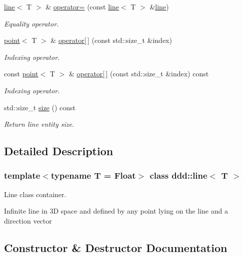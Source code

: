 \begin{DoxyCompactItemize}
\hyperlink{classddd_1_1line}{line}$<$ T $>$ \& \hyperlink{classddd_1_1line_a22cb20bea375f801ada57f910f6d66e2}{operator=} (const \hyperlink{classddd_1_1line}{line}$<$ T $>$ \&\hyperlink{classddd_1_1line}{line})
\begin{DoxyCompactList}\small\item\em Equality operator. \end{DoxyCompactList}\item 
\hyperlink{classddd_1_1point}{point}$<$ T $>$ \& \hyperlink{classddd_1_1line_a04a2abe2c302b5ca97074116b2c39499}{operator\mbox{[}$\,$\mbox{]}} (const std\+::size\+\_\+t \&index)
\begin{DoxyCompactList}\small\item\em Indexing operator. \end{DoxyCompactList}\item 
const \hyperlink{classddd_1_1point}{point}$<$ T $>$ \& \hyperlink{classddd_1_1line_af12bf431234fac2996ca667ee4f70f3a}{operator\mbox{[}$\,$\mbox{]}} (const std\+::size\+\_\+t \&index) const
\begin{DoxyCompactList}\small\item\em Indexing operator. \end{DoxyCompactList}\item 
\mbox{\label{classddd_1_1line_a0ea347ed20be8fdfe15f960008e3e475}} 
std\+::size\+\_\+t \hyperlink{classddd_1_1line_a0ea347ed20be8fdfe15f960008e3e475}{size} () const
\begin{DoxyCompactList}\small\item\em Return line entity size. \end{DoxyCompactList}\end{DoxyCompactItemize}


\subsection{Detailed Description}
\subsubsection*{template$<$typename T = Float$>$\newline
class ddd\+::line$<$ T $>$}

Line class container. 

Infinite line in 3D space and defined by any point lying on the line and a direction vector 

\subsection{Constructor \& Destructor Documentation}
\mbox{\label{classddd_1_1line_a1b5a2bea42f89d3d77bde14f49f072d9}} 
